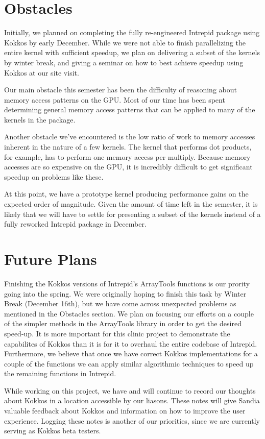 \documentclass[midyear]{hmcclinic}
\begin{document}
\section*{Obstacles}
Initially, we planned on completing the  fully re-engineered Intrepid
package using Kokkos by early December. While we were not able to 
finish parallelizing the entire kernel with sufficient speedup, we plan on 
delivering a subset of the kernels by winter break, and giving a seminar
on how to best achieve speedup using Kokkos at our site visit.

Our main obstacle this semester has been the difficulty of reasoning about 
memory access patterns on the GPU. Most of our time has been spent determining
general memory access patterns that can be applied to many of the kernels
in the package.

Another obstacle we've encountered is the low ratio of work to memory accesses 
inherent in the nature of a few kernels. The kernel that performs dot products, for example,
has to perform one memory access per multiply. Because memory accesses are so 
expensive on the GPU, it is incredibly difficult to get significant speedup on problems like 
these.

At this point, we have a prototype kernel producing performance gains on the expected
order of magnitude.  Given the amount of time left in the semester,
it is likely that we will have to settle for presenting a subset of the kernels
instead of a fully reworked Intrepid package in December. 

\section*{Future Plans}
Finishing the Kokkos versions of Intrepid's ArrayTools functions is our prority
going into the spring.  We were originally hoping to finish this task by Winter
Break (December 16th), but we have come across unexpected problems as mentioned
in the Obstacles section. We plan on focusing
our efforts on a couple of the simpler methods in the ArrayTools library in
order to get the desired speed-up. It is more important for this 
clinic project to demonstrate the capabilites of Kokkos than it is for it to
overhaul the entire codebase of Intrepid. Furthermore, we believe that once 
we have correct Kokkos implementations
for a couple of the functions we can apply similar algorithmic techniques
to speed up the remaining functions in Intrepid. 

While working on this project, we have and will continue to record our
thoughts about Kokkos in a location accessible by our liasons. 
These notes will give Sandia valuable feedback about Kokkos and
information on how to improve the user experience. Logging these
notes is another of our priorities, since we are currently serving
as Kokkos beta testers. 
\end{document}
